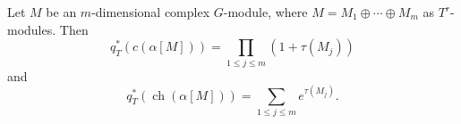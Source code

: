 Let $M$ be an $m$-dimensional complex $G$-module, where $M = M_1 \oplus \cdots \oplus M_m$ as $T^r$-modules. Then
\[
q_T^*(c(\alpha[M])) = \prod_{1 \leq j \leq m} (1 + \tau(M_j))
\]
and
\[
q_T^*(\operatorname{ch}(\alpha[M])) = \sum_{1 \leq j \leq m} e^{\tau(M_j)}.
\]
